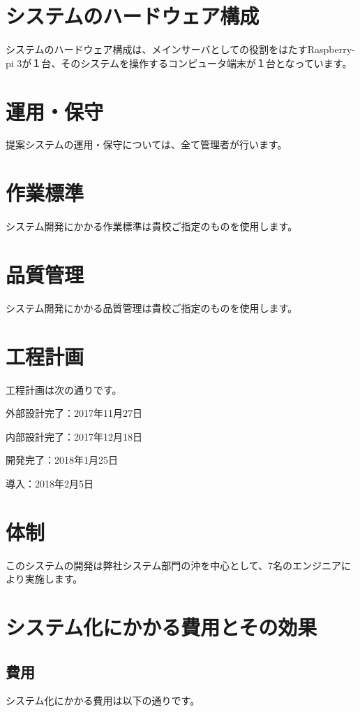 \documentclass[a4j,titlepage]{ujarticle}
\begin{document}
\section{システムのハードウェア構成}
システムのハードウェア構成は、メインサーバとしての役割をはたすRaspberry-pi 3が１台、そのシステムを操作するコンピュータ端末が１台となっています。 %

\section{運用・保守}
提案システムの運用・保守については、全て管理者が行います。 %

\section{作業標準}
システム開発にかかる作業標準は貴校ご指定のものを使用します。

\section{品質管理}
システム開発にかかる品質管理は貴校ご指定のものを使用します。

\section{工程計画}
工程計画は次の通りです。

外部設計完了：2017年11月27日

内部設計完了：2017年12月18日

開発完了：2018年1月25日

導入：2018年2月5日

\section{体制}
このシステムの開発は弊社システム部門の沖を中心として、7名のエンジニアにより実施します。

\section{システム化にかかる費用とその効果}
\subsection{費用}
システム化にかかる費用は以下の通りです。
\end{document}

